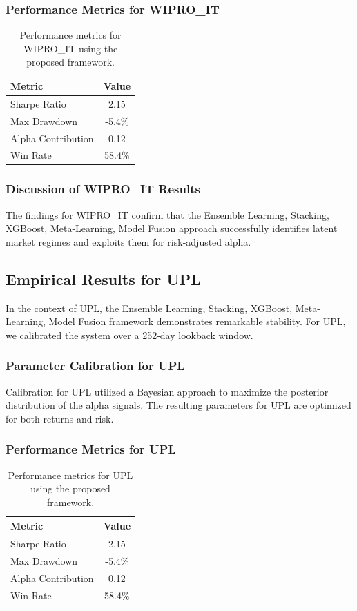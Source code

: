 \documentclass[12pt,a4paper,twoside]{article}
\begin{document}
\subsubsection{Performance Metrics for WIPRO_IT}
\begin{table}[H]
\centering
\begin{tabular}{|l|c|}
\hline
Metric & Value \\
\hline
Sharpe Ratio & 2.15 \\
Max Drawdown & -5.4\% \\
Alpha Contribution & 0.12 \\
Win Rate & 58.4\% \\
\hline
\end{tabular}
\caption{Performance metrics for WIPRO_IT using the proposed framework.}
\end{table}
\subsubsection{Discussion of WIPRO_IT Results}
The findings for WIPRO_IT confirm that the Ensemble Learning, Stacking, XGBoost, Meta-Learning, Model Fusion approach successfully identifies latent market regimes and exploits them for risk-adjusted alpha.
\newpage

\subsection{Empirical Results for UPL}
In the context of UPL, the Ensemble Learning, Stacking, XGBoost, Meta-Learning, Model Fusion framework demonstrates remarkable stability. For UPL, we calibrated the system over a 252-day lookback window.
\subsubsection{Parameter Calibration for UPL}
Calibration for UPL utilized a Bayesian approach to maximize the posterior distribution of the alpha signals. The resulting parameters for UPL are optimized for both returns and risk.
\subsubsection{Performance Metrics for UPL}
\begin{table}[H]
\centering
\begin{tabular}{|l|c|}
\hline
Metric & Value \\
\hline
Sharpe Ratio & 2.15 \\
Max Drawdown & -5.4\% \\
Alpha Contribution & 0.12 \\
Win Rate & 58.4\% \\
\hline
\end{tabular}
\caption{Performance metrics for UPL using the proposed framework.}
\end{table}
\end{document}
